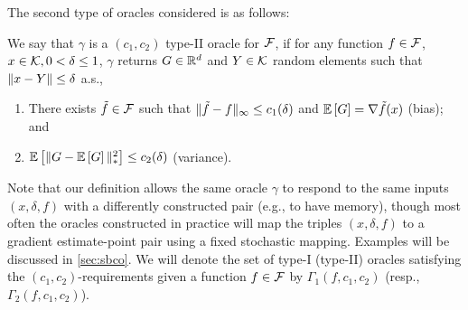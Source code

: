 The second type of oracles considered is as follows:
\begin{definition}
\label{def:oracle2}
We say that $\gamma$ is a  $(c_1,c_2)$ type-II oracle for $\mathcal{F}$, if for any function $f\in \mathcal{F}$,
$x\in \mathcal{K},0<\delta\le 1$, $\gamma$ returns $G\in \mathbb{R}^d$ and  $Y\in \mathcal{K}$ random elements such that $\|x-Y\|\le \delta$ a.s.,
\vspace{-0.2cm}
\begin{enumerate}
\item There exists $\tilde{f} \in \mathcal{F}$ such that
$\|\tilde{f}- f\|_\infty \le c_1(\delta)$  and
$\mathbb{E}\left[G\right]  = \nabla \tilde{f}(x)$ (bias); and
\item $\mathbb{E}\left[\| G -  \mathbb{E}\left[G\right] \|_*^2\right] \le c_2(\delta)$ (variance).
\end{enumerate}
\vspace{-0.1cm}
\end{definition}
%
Note that our definition allows the same oracle $\gamma$ to respond to the same inputs $(x,\delta,f)$ with a differently constructed pair (e.g., to have memory),
though most often the oracles constructed in practice
will map the triples $(x,\delta,f)$ to a gradient estimate-point pair using a fixed stochastic mapping.
Examples will be discussed in  \cref{sec:sbco}.
We will denote the set of type-I (type-II) oracles satisfying the $(c_1,c_2)$-requirements given a function $f\in \mathcal{F}$ by $\Gamma_1(f,c_1,c_2)$ (resp., $\Gamma_2(f,c_1,c_2)$).



